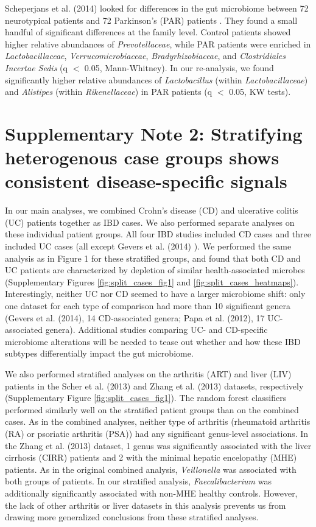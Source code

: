 \documentclass{article}
\begin{document}
{Scheperjans et al. (2014) looked for differences in the gut microbiome between 72 neurotypical patients and 72 Parkinson's (PAR) patients \cite{par-schep}. 
They found a small handful of significant differences at the family level. 
Control patients showed higher relative abundances of \textit{Prevotellaceae}, while PAR patients were enriched in \textit{Lactobacillaceae}, \textit{Verrucomicrobiaceae}, \textit{Bradyrhizobiaceae}, and \textit{Clostridiales Incertae Sedis} (q $<$ 0.05, Mann-Whitney). 
In our re-analysis, we found significantly higher relative abundances of \textit{Lactobacillus} (within \textit{Lactobacillaceae}) and \textit{Alistipes} (within \textit{Rikenellaceae}) in PAR patients (q $<$ 0.05, KW tests).

\section*{Supplementary Note 2: Stratifying heterogenous case groups shows consistent disease-specific signals}\label{sec:split_cases}

In our main analyses, we combined Crohn's disease (CD) and ulcerative colitis (UC) patients together as IBD cases.
We also performed separate analyses on these individual patient groups.
All four IBD studies included CD cases and three included UC cases (all except Gevers et al. (2014) \cite{ibd-gevers}).
We performed the same analysis as in Figure 1 for these stratified groups, and found that both CD and UC patients are characterized by depletion of similar health-associated microbes (Supplementary Figures \ref{fig:split_cases_fig1} and \ref{fig:split_cases_heatmaps}).
Interestingly, neither UC nor CD seemed to have a larger microbiome shift: only one dataset for each type of comparison had more than 10 significant genera (Gevers et al. (2014), 14 CD-associated genera; Papa et al. (2012), 17 UC-associated genera).
Additional studies comparing UC- and CD-specific microbiome alterations will be needed to tease out whether and how these IBD subtypes differentially impact the gut microbiome.

We also performed stratified analyses on the arthritis (ART) and liver (LIV) patients in the Scher et al. (2013) and Zhang et al. (2013) datasets, respectively \cite{mhe-zhang, ra-littman} (Supplementary Figure \ref{fig:split_cases_fig1}).
The random forest classifiers performed similarly well on the stratified patient groups than on the combined cases.
As in the combined analyses, neither type of arthritis (rheumatoid arthritis (RA) or psoriatic arthritis (PSA)) had any significant genus-level associations.
In the Zhang et al. (2013) dataset, 1 genus was significantly associated with the liver cirrhosis (CIRR) patients and 2 with the minimal hepatic encelopathy (MHE) patients.
As in the original combined analysis, \textit{Veillonella} was associated with both groups of patients.
In our stratified analysis, \textit{Faecalibacterium} was additionally significantly associated with non-MHE healthy controls.
However, the lack of other arthritis or liver datasets in this analysis prevents us from drawing more generalized conclusions from these stratified analyses.

}
\end{document}
